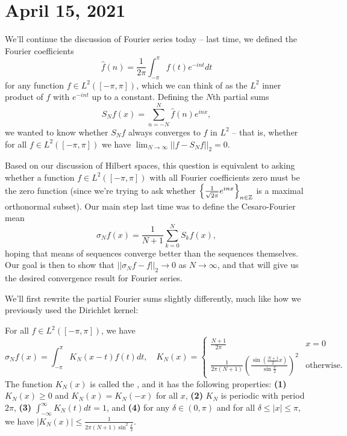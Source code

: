 \pagebreak\section{April 15, 2021}

We'll continue the discussion of Fourier series today -- last time, we defined the Fourier coefficients 
\[
    \hat{f}(n) = \frac{1}{2\pi} \int_{-\pi}^{\pi} f(t) e^{-int} dt
\]
for any function $f \in L^2([-\pi, \pi])$, which we can think of as the $L^2$ inner product of $f$ with $e^{-int}$ up to a constant. Defining the $N$th partial sums
\[
    S_Nf(x) = \sum_{n=-N}^N \hat{f}(n) e^{inx},
\]
we wanted to know whether $S_Nf$ always converges to $f$ in $L^2$ -- that is, whether for all $f \in L^2([-\pi, \pi])$ we have $\lim_{N \to \infty} ||f - S_N f||_2 = 0$.

Based on our discussion of Hilbert spaces, this question is equivalent to asking whether a function $f \in L^2([-\pi, \pi])$ with all Fourier coefficients zero must be the zero function (since we're trying to ask whether $\left\{\frac{1}{\sqrt{2\pi}} e^{inx}\right\}_{n \in \mathbb Z}$ is a maximal orthonormal subset). Our main step last time was to define the Cesaro-Fourier mean 
\[
    \sigma_N f(x) = \frac{1}{N+1} \sum_{k=0}^N S_k f(x),
\]
hoping that means of sequences converge better than the sequences themselves. Our goal is then to show that $||\sigma_N f - f||_2 \to 0$ as $N \to \infty$, and that will give us the desired convergence result for Fourier series.

We'll first rewrite the partial Fourier sums slightly differently, much like how we previously used the Dirichlet kernel:

\begin{proposition}
For all $f \in L^2([-\pi, \pi])$, we have 
\[
    \sigma_N f(x) = \int_{-\pi}^\pi K_N(x-t) f(t) dt, \quad K_N(x) = \begin{cases} \frac{N+1}{2\pi} & x = 0 \\ \frac{1}{2\pi(N+1)} \left(\frac{\sin\left(\frac{N+1}{2} x\right)}{\sin \frac{x}{2}}\right)^2 & \text{otherwise}. \end{cases}
\]
The function $K_N(x)$ is called the , and it has the following properties: \textbf{(1)} $K_N(x) \ge 0$ and $K_N(x) = K_N(-x)$ for all $x$, \textbf{(2)} $K_N$ is periodic with period $2\pi$, \textbf{(3)} $\int_{-\infty}^{\infty} K_N(t) dt = 1$, and \textbf{(4)} for any $\delta \in (0, \pi)$ and for all $\delta \le |x| \le \pi$, we have $|K_N(x)| \le \frac{1}{2\pi(N+1) \sin^2\frac{\delta}{2}}$.
\end{proposition}

